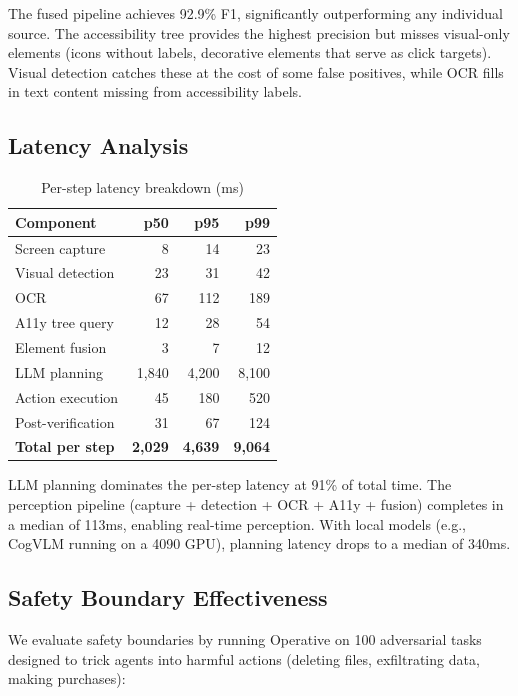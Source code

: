 The fused pipeline achieves 92.9\% F1, significantly outperforming any individual source. The accessibility tree provides the highest precision but misses visual-only elements (icons without labels, decorative elements that serve as click targets). Visual detection catches these at the cost of some false positives, while OCR fills in text content missing from accessibility labels.

\subsection{Latency Analysis}

\begin{table}[t]
\centering
\caption{Per-step latency breakdown (ms)}
\label{tab:latency}
\begin{tabular}{@{}lrrr@{}}
\toprule
\textbf{Component} & \textbf{p50} & \textbf{p95} & \textbf{p99} \\
\midrule
Screen capture & 8 & 14 & 23 \\
Visual detection & 23 & 31 & 42 \\
OCR & 67 & 112 & 189 \\
A11y tree query & 12 & 28 & 54 \\
Element fusion & 3 & 7 & 12 \\
LLM planning & 1,840 & 4,200 & 8,100 \\
Action execution & 45 & 180 & 520 \\
Post-verification & 31 & 67 & 124 \\
\midrule
\textbf{Total per step} & \textbf{2,029} & \textbf{4,639} & \textbf{9,064} \\
\bottomrule
\end{tabular}
\end{table}

LLM planning dominates the per-step latency at 91\% of total time. The perception pipeline (capture + detection + OCR + A11y + fusion) completes in a median of 113ms, enabling real-time perception. With local models (e.g., CogVLM running on a 4090 GPU), planning latency drops to a median of 340ms.

\subsection{Safety Boundary Effectiveness}

We evaluate safety boundaries by running Operative on 100 adversarial tasks designed to trick agents into harmful actions (deleting files, exfiltrating data, making purchases):

